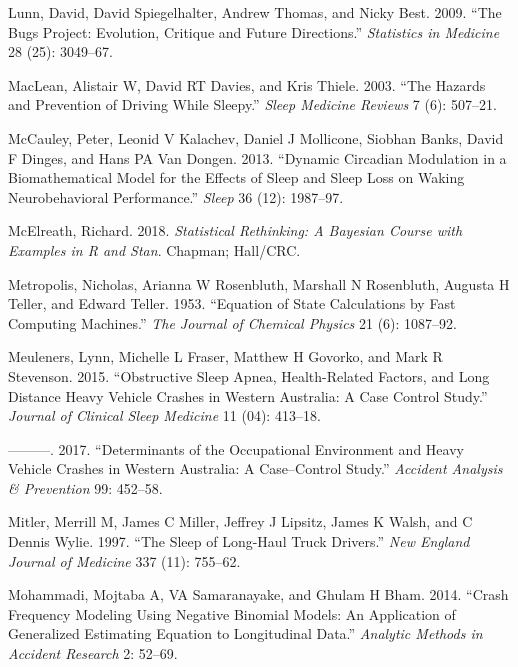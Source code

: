 \documentclass[12pt]{book}
\numberwithin{equation}{chapter}
\begin{document}
\leavevmode\hypertarget{ref-lunn2009bugs}{}%
Lunn, David, David Spiegelhalter, Andrew Thomas, and Nicky Best. 2009. ``The Bugs Project: Evolution, Critique and Future Directions.'' \emph{Statistics in Medicine} 28 (25): 3049--67.

\leavevmode\hypertarget{ref-maclean2003hazards}{}%
MacLean, Alistair W, David RT Davies, and Kris Thiele. 2003. ``The Hazards and Prevention of Driving While Sleepy.'' \emph{Sleep Medicine Reviews} 7 (6): 507--21.

\leavevmode\hypertarget{ref-mccauley2013dynamic}{}%
McCauley, Peter, Leonid V Kalachev, Daniel J Mollicone, Siobhan Banks, David F Dinges, and Hans PA Van Dongen. 2013. ``Dynamic Circadian Modulation in a Biomathematical Model for the Effects of Sleep and Sleep Loss on Waking Neurobehavioral Performance.'' \emph{Sleep} 36 (12): 1987--97.

\leavevmode\hypertarget{ref-mcelreath2018statistical}{}%
McElreath, Richard. 2018. \emph{Statistical Rethinking: A Bayesian Course with Examples in R and Stan}. Chapman; Hall/CRC.

\leavevmode\hypertarget{ref-metropolis1953equation}{}%
Metropolis, Nicholas, Arianna W Rosenbluth, Marshall N Rosenbluth, Augusta H Teller, and Edward Teller. 1953. ``Equation of State Calculations by Fast Computing Machines.'' \emph{The Journal of Chemical Physics} 21 (6): 1087--92.

\leavevmode\hypertarget{ref-meuleners2015obstructive}{}%
Meuleners, Lynn, Michelle L Fraser, Matthew H Govorko, and Mark R Stevenson. 2015. ``Obstructive Sleep Apnea, Health-Related Factors, and Long Distance Heavy Vehicle Crashes in Western Australia: A Case Control Study.'' \emph{Journal of Clinical Sleep Medicine} 11 (04): 413--18.

\leavevmode\hypertarget{ref-meuleners2017determinants}{}%
---------. 2017. ``Determinants of the Occupational Environment and Heavy Vehicle Crashes in Western Australia: A Case--Control Study.'' \emph{Accident Analysis \& Prevention} 99: 452--58.

\leavevmode\hypertarget{ref-mitler1997sleep}{}%
Mitler, Merrill M, James C Miller, Jeffrey J Lipsitz, James K Walsh, and C Dennis Wylie. 1997. ``The Sleep of Long-Haul Truck Drivers.'' \emph{New England Journal of Medicine} 337 (11): 755--62.

\leavevmode\hypertarget{ref-mohammadi2014crash}{}%
Mohammadi, Mojtaba A, VA Samaranayake, and Ghulam H Bham. 2014. ``Crash Frequency Modeling Using Negative Binomial Models: An Application of Generalized Estimating Equation to Longitudinal Data.'' \emph{Analytic Methods in Accident Research} 2: 52--69.
\end{document}
